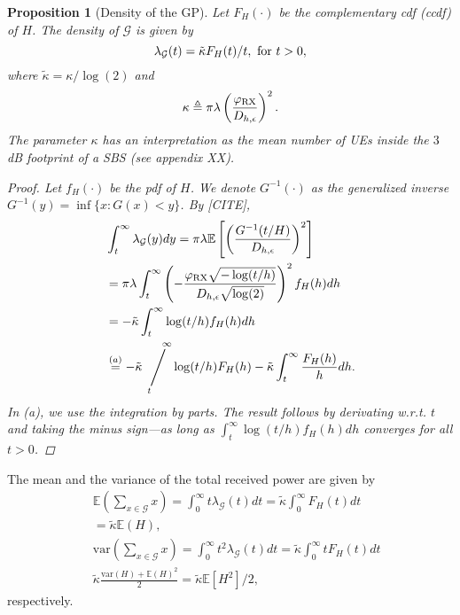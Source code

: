 \documentclass[conference]{IEEEtran}
\newcommand{\viiva}{\mathop{\Bigg/}}
\newcommand{\sij}[3]{\viiva\limits_{\hspace*{-5mm}{#1}}^{\hspace*{5mm}{#2}}{#3}}
\theoremstyle{definition}
\theoremstyle{plain}
\newtheorem{prop}[thm4]{Proposition}
\begin{document}
            \begin{prop}[Density of the GP]
              Let $F_H(\cdot)$ be the complementary cdf (ccdf) of $H$. The density of $\mathcal{G}$ is given by
              \begin{equation}
                \label{eq:GPdensity}
                \lambda_{\mathcal{G}}(t)= \tilde{\kappa}F_H(t)/t, \text{ \text{for} }t>0,
              \end{equation}
              where $\tilde{\kappa}= \kappa/\log(2)$ and
              \begin{equation}
                \label{eq:kappa}
                      {\kappa} \triangleq    \pi \lambda   \left(\frac{\varphi_{\textup{RX}}}{D_{h,\epsilon}}\right)^2.
              \end{equation}
              The parameter $\kappa$ has an interpretation as the mean number of UEs inside the $3$ dB footprint of a SBS (see appendix XX).
              \begin{proof}
                Let $f_H(\cdot)$ be the pdf of $H$. We denote $G^{-1}(\cdot)$ as the generalized inverse $G^{-1}(y) = \inf \{x:G(x)<y\}$. By [CITE],
                \begin{align*}
                  &\int_t^{\infty}\lambda_{\mathcal{G}}(y)dy \overset{}{=} \pi \lambda \mathbb{E}\left[ \left(\frac{G^{-1}(t/H)}{D_{h,\epsilon}}\right)^2 \right] \\
                  &=\pi \lambda \int_t^{\infty} \left(-\frac{\varphi_{\text{RX}}\sqrt{-\log(t/h)}}{D_{h,\epsilon} \sqrt{\log(2)}}\right)^2f_H(h) dh  \\
                  &= -\tilde{\kappa} \int_t^{\infty} \log(t/h)f_H(h) dh\\
                  &\overset{(a)}{=} -\tilde{\kappa} \sij{t}{\infty} \log(t/h)F_H(h) - \tilde{\kappa} \int_t^{\infty}\frac{F_H(h)}{h} dh.
                \end{align*}
                In (a), we use the integration by parts. The result follows by derivating w.r.t. $t$ and taking the minus sign---as long as $\int_t^{\infty} \log(t/h)f_H(h) dh$ converges for all $t>0$.
              \end{proof}
            \end{prop}

          The mean and the variance of the total received power are given by
          \begin{align}
            &\mathbb{E}\left(\sum_{x \in \mathcal{G}} x \right) = \int_{0}^{\infty} t\lambda_{\mathcal{G}}(t) dt = \tilde{\kappa} \int_{0}^{\infty}F_H(t) dt \nonumber \\
            &=\tilde{\kappa} \mathbb{E}(H), \\\
            &\text{var}\left(\sum_{x \in \mathcal{G}} x \right) = \int_{0}^{\infty} t^2\lambda_{\mathcal{G}}(t) dt= \tilde{\kappa} \int_0^{\infty}tF_H(t) dt  \nonumber \\
           & \tilde{\kappa} \frac{\text{var}(H) + \mathbb{E}(H)^2}{2} = \tilde{\kappa}  \mathbb{E}[H^2]/2,
          \end{align}
          respectively. 
\end{document}
